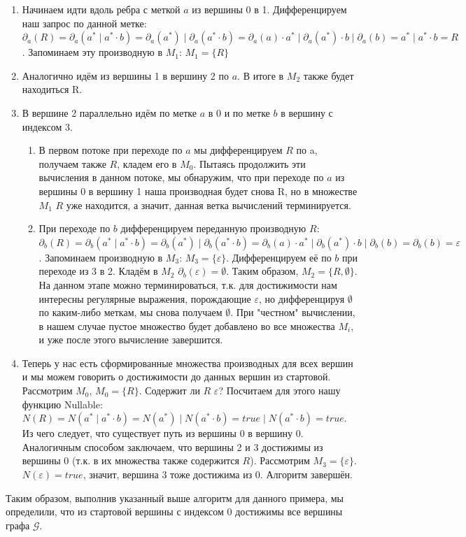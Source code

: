\begin{example}
\begin{enumerate}
    \item Начинаем идти вдоль ребра с меткой $a$ из вершины 0 в 1. Дифференцируем наш запрос по данной метке: $\partial_{a}(R) = \partial_{a}(a^* \mid a^* \cdot b) = \partial_{a}(a^*) \mid \partial_{a}(a^* \cdot b) = \partial_{a}(a) \cdot a^* \mid \partial_{a}(a^*) \cdot b \mid \partial_{a}(b) = a^* \mid a^* \cdot b = R$. Запоминаем эту производную в $M_{1}$:  $M_{1} = \{R\}$ 
    \item Аналогично идём из вершины 1 в вершину 2 по $a$. В итоге в $M_{2}$ также будет находиться R.
    \item В вершине 2 параллельно идём по метке $a$ в 0 и по метке $b$ в вершину с индексом 3. 
    \begin{enumerate}
        \item В первом потоке при переходе по $a$ мы дифференцируем $R$ по a, получаем также $R$, кладем его в $M_{0}$. Пытаясь продолжить эти вычисления в данном потоке, мы обнаружим, что при переходе по $a$ из вершины 0 в вершину 1 наша производная будет снова R, но в множестве $M_{1}$ $R$ уже находится, а значит, данная ветка вычислений терминируется.
        \item При переходе по $b$ дифференцируем переданную производную $R$: $\partial_{b}(R) = \partial_{b}(a^* \mid a^* \cdot b) = \partial_{b}(a^*) \mid \partial_{b}(a^* \cdot b) = \partial_{b}(a) \cdot a^* \mid \partial_{b}(a^*) \cdot b \mid \partial_{b}(b) = \partial_{b}(b) = \varepsilon$. Запоминаем производную в $M_{3}$:  $M_{3} = \{\varepsilon\}$. Дифференцируем её по $b$ при переходе из 3 в 2. Кладём в $M_{2}$ $\partial_{b}(\varepsilon) = \emptyset$. Таким образом, $M_{2} = \{R, \emptyset\}$. На данном этапе можно терминироваться, т.к. для достижимости нам интересны регулярные выражения, порождающие $\varepsilon$, но дифференцируя $\emptyset$ по каким-либо меткам, мы снова получаем $\emptyset$. При "честном" вычислении, в нашем случае пустое множество будет добавлено во все множества $M_{i}$, и уже после этого вычисление завершится.    
    \end{enumerate}
    \item Теперь у нас есть сформированные множества производных для всех вершин и мы можем говорить о достижимости до данных вершин из стартовой. Рассмотрим $M_{0}$, $M_{0} = \{R\}$. Содержит ли $R$ $\varepsilon$? Посчитаем для этого нашу функцию Nullable: $N(R) = N(a^* \mid a^* \cdot b) = N(a^*) \mid N(a^* \cdot b) = true \mid N(a^* \cdot b) = true$. Из чего следует, что существует путь из вершины 0 в вершину 0. Аналогичным способом заключаем, что вершины 2 и 3 достижимы из вершины 0 (т.к. в их множества также содержится $R$). Рассмотрим $M_{3} = \{\varepsilon\}$. $N(\varepsilon) = true$, значит, вершина 3 тоже достижима из 0. Алгоритм завершён.
\end{enumerate}

Таким образом, выполнив указанный выше алгоритм для данного примера, мы определили, что из стартовой вершины с индексом 0 достижимы все вершины графа $\mathcal{G}$.
\end{example}


